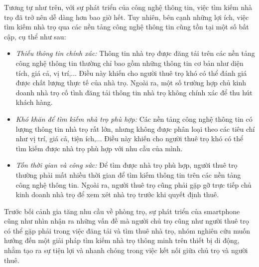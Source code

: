 Tương tự như trên, với sự phát triển của công nghệ thông tin, việc tìm kiếm nhà trọ đã trở nên dễ dàng hơn bao giờ hết. Tuy nhiên, bên cạnh những lợi ích, việc tìm kiếm nhà trọ qua các nền tảng công nghệ thông tin cũng tồn tại một số bất cập, cụ thể như sau:
\begin{itemize}
    \item \textit{Thiếu thông tin chính xác:} Thông tin nhà trọ được đăng tải trên các nền tảng công nghệ thông tin thường chỉ bao gồm những thông tin cơ bản như diện tích, giá cả, vị trí,... Điều này khiến cho người thuê trọ khó có thể đánh giá được chất lượng thực tế của nhà trọ. Ngoài ra, một số trường hợp chủ kinh doanh nhà trọ cố tình đăng tải thông tin nhà trọ không chính xác để thu hút khách hàng.
    \item \textit{Khó khăn để tìm kiếm nhà trọ phù hợp:} Các nền tảng công nghệ thông tin có lượng thông tin nhà trọ rất lớn, nhưng không được phân loại theo các tiêu chí như vị trí, giá cả, tiện ích,... Điều này khiến cho người thuê trọ khó có thể tìm kiếm được nhà trọ phù hợp với nhu cầu của mình.
    \item \textit{Tốn thời gian và công sức:} Để tìm được nhà trọ phù hợp, người thuê trọ thường phải mất nhiều thời gian để tìm kiếm thông tin trên các nền tảng công nghệ thông tin. Ngoài ra, người thuê trọ cũng phải gặp gỡ trực tiếp chủ kinh doanh nhà trọ để xem xét nhà trọ trước khi quyết định thuê.
\end{itemize}
Trước bối cảnh gia tăng nhu cầu về phòng trọ, sự phát triển của smartphone cũng như nhìn nhận ra những vấn đề mà người chủ trọ cũng như người thuê trọ có thể gặp phải trong việc đăng tải và tìm thuê nhà trọ, nhóm nghiên cứu muốn hướng đến một giải pháp tìm kiếm nhà trọ thông minh trên thiết bị di động, nhằm tạo ra sự tiện lợi và nhanh chóng trong việc kết nối giữa chủ trọ và người thuê.